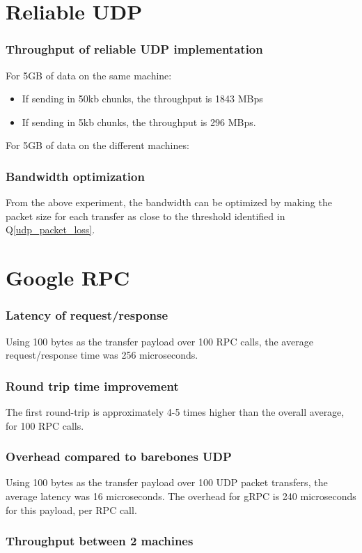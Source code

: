 \documentclass[a4paper]{article}
\begin{document}
\part{Reliable UDP}

\section{Throughput of reliable UDP implementation}
For 5GB of data on the same machine:
\begin{itemize}
	\item If sending in 50kb chunks, the throughput is 1843 MBps
	\item If sending in 5kb chunks, the throughput is 296 MBps.
\end{itemize}

For 5GB of data on the different machines:


\section{Bandwidth optimization}
From the above experiment, the bandwidth can be optimized by making the packet size for each transfer as close to the threshold identified in Q\ref{udp_packet_loss}.

\part{Google RPC}

\section{Latency of request/response}
Using 100 bytes as the transfer payload over 100 RPC calls, the average request/response time was 256 microseconds.

\section{Round trip time improvement}
The first round-trip is approximately 4-5 times higher than the overall average, for 100 RPC calls.

\section{Overhead compared to barebones UDP}
Using 100 bytes as the transfer payload over 100 UDP packet transfers, the average latency was 16 microseconds. 
The overhead for gRPC is 240 microseconds for this payload, per RPC call.

\section{Throughput between 2 machines}
\end{document}
